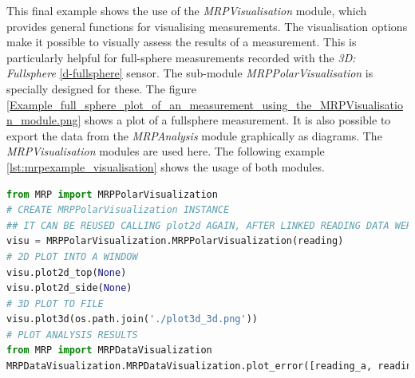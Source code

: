 This final example shows the use of the \emph{MRPVisualisation} module,
which provides general functions for visualising measurements. The
visualisation options make it possible to visually assess the results of
a measurement. This is particularly helpful for full-sphere measurements
recorded with the \emph{3D: Fullsphere} \ref{d-fullsphere} sensor. The
sub-module \emph{MRPPolarVisualisation} is specially designed for these.
The figure
\ref{Example_full_sphere_plot_of_an_measurement_using_the_MRPVisualisation_module.png}
shows a plot of a fullsphere measurement. It is also possible to export
the data from the \emph{MRPAnalysis} module graphically as diagrams. The
\emph{MRPVisualisation} modules are used here. The following example
\ref{lst:mrpexample_visualisation} shows the usage of both modules.

\begin{lstlisting}[language=Python, caption={MRPVisualisation example which plots a fullsphere to an image file}, label=lst:mrpexample_visualisation]
from MRP import MRPPolarVisualization
# CREATE MRPPolarVisualization INSTANCE
## IT CAN BE REUSED CALLING plot2d AGAIN, AFTER LINKED READING DATA WERE MODIFIED
visu = MRPPolarVisualization.MRPPolarVisualization(reading)
# 2D PLOT INTO A WINDOW
visu.plot2d_top(None)
visu.plot2d_side(None)
# 3D PLOT TO FILE
visu.plot3d(os.path.join('./plot3d_3d.png'))
# PLOT ANALYSIS RESULTS
from MRP import MRPDataVisualization
MRPDataVisualization.MRPDataVisualization.plot_error([reading_a, reading_b, reading_c])
\end{lstlisting}

